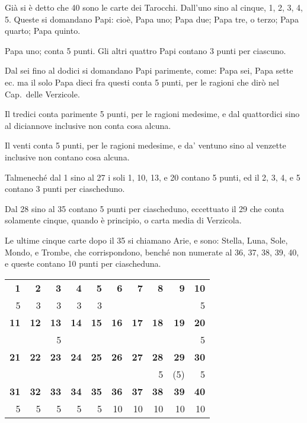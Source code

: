 \documentclass[11pt,a6paper]{article}
\begin{document}
Già si è detto che 40 sono le carte
dei Tarocchi. Dall'uno sino al cinque, 1, 2, 3, 4, 5. Queste si domandano Papi: cioè, Papa uno; Papa due; Papa tre, o terzo; Papa quarto; Papa quinto.

Papa uno; conta 5 punti. Gli altri quattro Papi contano 3 punti per ciascuno.

Dal sei fino al dodici si domandano Papi parimente, come: Papa sei, Papa sette ec. ma il solo Papa dieci fra questi conta 5 punti, per le ragioni che dirò nel Cap.\ delle Verzicole.

Il tredici conta parimente 5 punti, per le ragioni medesime, e dal quattordici sino al diciannove inclusive non conta cosa alcuna.

Il venti conta 5 punti, per le ragioni medesime, e da' ventuno sino al venzette inclusive non contano cosa alcuna.

Talmeneché dal 1 sino al 27 i soli 1, 10, 13, e 20 contano 5 punti, ed il 2, 3, 4, e 5 contano 3 punti per ciascheduno.

Dal 28 sino al 35 contano 5 punti per ciascheduno, eccettuato il 29 che conta solamente cinque, quando è principio, o carta media di Verzicola.

Le ultime cinque carte dopo il 35 si chiamano Arie, e sono: Stella, Luna, Sole, Mondo, e Trombe, che corrispondono, benché non numerate al 36, 37, 38, 39, 40, e queste contano 10 punti per ciascheduna.

\vspace{24pt}


{\noindent \scriptsize
  \begin{tabular}{*{10}{|r}|}
\bf  1& \bf 2& \bf 3& \bf 4& \bf 5& \bf 6&\bf  7&\bf  8&\bf  9& \bf 10\\
  5& 3& 3& 3& 3&  &  &  &  & 5\\
\bf 11&\bf 12&\bf 13&\bf 14&\bf 15&\bf 16&\bf 17&\bf 18&\bf 19&\bf 20\\
   &  & 5&  &  &  &  &  &  & 5\\
\bf 21&\bf 22&\bf 23&\bf 24&\bf 25&\bf 26&\bf 27&\bf 28&\bf 29&\bf 30\\
   &  &  &  &  &  &  & 5& (5)& 5\\
\bf 31&\bf 32&\bf 33&\bf 34&\bf 35&\bf 36&\bf 37&\bf 38&\bf 39&\bf 40\\
     5&     5&     5&     5&     5&    10&    10&    10&    10&    10\\
  \end{tabular}
}
\end{document}
